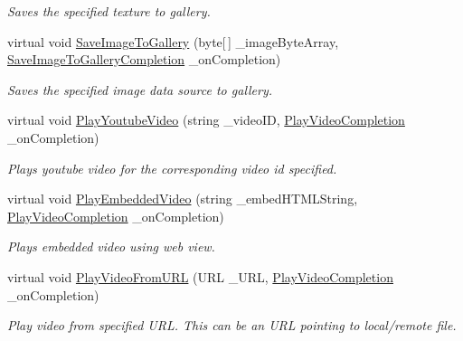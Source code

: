 \begin{DoxyCompactItemize}
\begin{DoxyCompactList}\small\item\em Saves the specified texture to gallery. \end{DoxyCompactList}\item 
virtual void \hyperlink{class_voxel_busters_1_1_native_plugins_1_1_media_library_a302c749e6655fdd24b55bbf54ba3512f}{Save\+Image\+To\+Gallery} (byte\mbox{[}$\,$\mbox{]} \+\_\+image\+Byte\+Array, \hyperlink{class_voxel_busters_1_1_native_plugins_1_1_media_library_a2dc4a641f32b69e42c223332fa7dfebd}{Save\+Image\+To\+Gallery\+Completion} \+\_\+on\+Completion)
\begin{DoxyCompactList}\small\item\em Saves the specified image data source to gallery. \end{DoxyCompactList}\item 
virtual void \hyperlink{class_voxel_busters_1_1_native_plugins_1_1_media_library_a34913dd531622ffa0eeb8a41c610844f}{Play\+Youtube\+Video} (string \+\_\+video\+I\+D, \hyperlink{class_voxel_busters_1_1_native_plugins_1_1_media_library_abdb2811c23515fd8ac3335152b5a8951}{Play\+Video\+Completion} \+\_\+on\+Completion)
\begin{DoxyCompactList}\small\item\em Plays youtube video for the corresponding video id specified. \end{DoxyCompactList}\item 
virtual void \hyperlink{class_voxel_busters_1_1_native_plugins_1_1_media_library_afecbbc321f2903974c5f65f31b4622fa}{Play\+Embedded\+Video} (string \+\_\+embed\+H\+T\+M\+L\+String, \hyperlink{class_voxel_busters_1_1_native_plugins_1_1_media_library_abdb2811c23515fd8ac3335152b5a8951}{Play\+Video\+Completion} \+\_\+on\+Completion)
\begin{DoxyCompactList}\small\item\em Plays embedded video using web view. \end{DoxyCompactList}\item 
virtual void \hyperlink{class_voxel_busters_1_1_native_plugins_1_1_media_library_a73aa1ce9546df342b6b407e762d10d98}{Play\+Video\+From\+U\+R\+L} (U\+R\+L \+\_\+\+U\+R\+L, \hyperlink{class_voxel_busters_1_1_native_plugins_1_1_media_library_abdb2811c23515fd8ac3335152b5a8951}{Play\+Video\+Completion} \+\_\+on\+Completion)
\begin{DoxyCompactList}\small\item\em Play video from specified U\+R\+L. This can be an U\+R\+L pointing to local/remote file. \end{DoxyCompactList}\item 

\end{DoxyCompactItemize}
